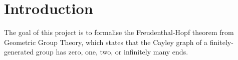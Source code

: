 \chapter*{Introduction}
\label{cha:intro}

The goal of this project is to formalise the Freudenthal-Hopf theorem from Geometric Group Theory, which states that the Cayley graph of a finitely-generated group has zero, one, two, or infinitely many ends.
